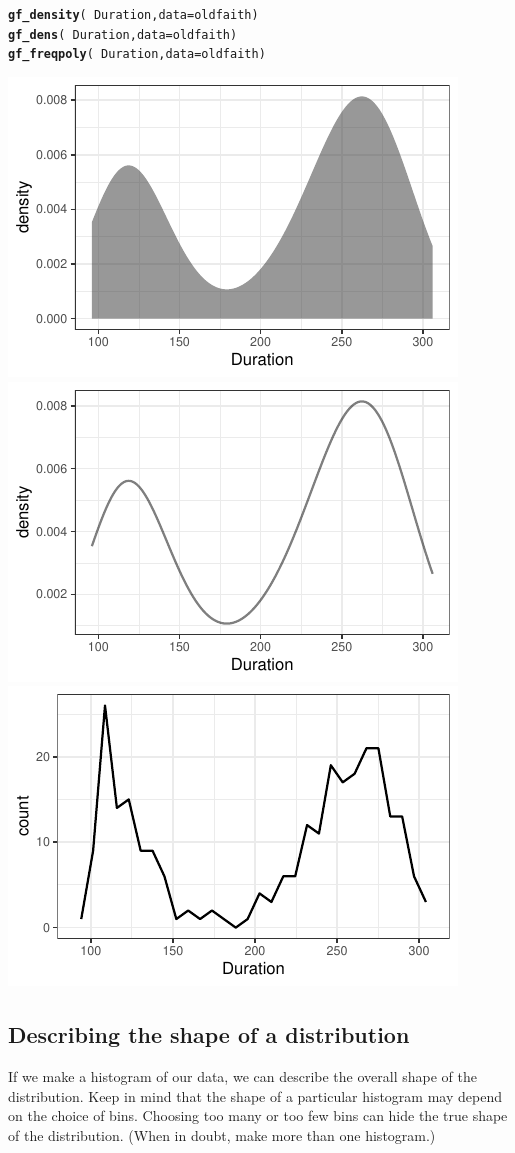 \documentclass[twoside]{book}\usepackage[]{graphicx}\usepackage[]{xcolor}
\makeatletter
\newcommand{\hlopt}[1]{\textcolor[rgb]{0,0,0}{#1}}%
\newcommand{\hlstd}[1]{\textcolor[rgb]{0.345,0.345,0.345}{#1}}%
\newcommand{\hlkwc}[1]{\textcolor[rgb]{0.333,0.667,0.333}{#1}}%
\newcommand{\hlkwd}[1]{\textcolor[rgb]{0.737,0.353,0.396}{\textbf{#1}}}%
\newenvironment{kframe}{%
 \def\at@end@of@kframe{}%
 \ifinner\ifhmode%
  \def\at@end@of@kframe{\end{minipage}}%
  \begin{minipage}{\columnwidth}%
 \fi\fi%
 \def\FrameCommand##1{\hskip\@totalleftmargin \hskip-\fboxsep
 \colorbox{shadecolor}{##1}\hskip-\fboxsep
     \hskip-\linewidth \hskip-\@totalleftmargin \hskip\columnwidth}%
 \MakeFramed {\advance\hsize-\width
   \@totalleftmargin\z@ \linewidth\hsize
   \@setminipage}}%
 {\par\unskip\endMakeFramed%
 \at@end@of@kframe}
\newenvironment{knitrout}{}{} %
\makeatother
\begin{document}
\begin{knitrout}
\color{fgcolor}\begin{kframe}
\begin{alltt}
\hlkwd{gf_density}\hlstd{(} \hlopt{~} \hlstd{Duration,} \hlkwc{data} \hlstd{= oldfaith )}
\hlkwd{gf_dens}\hlstd{(} \hlopt{~} \hlstd{Duration,} \hlkwc{data} \hlstd{= oldfaith )}
\hlkwd{gf_freqpoly}\hlstd{(} \hlopt{~} \hlstd{Duration,} \hlkwc{data} \hlstd{= oldfaith )}
\end{alltt}


{\ttfamily\noindent\itshape\color{messagecolor}{\#\# `stat\_bin()` using `bins = 30`. Pick better value with `binwidth`.}}\end{kframe}

{\centering \includegraphics[width=.3\textwidth]{figures/fig-density-1} 
\includegraphics[width=.3\textwidth]{figures/fig-density-2} 
\includegraphics[width=.3\textwidth]{figures/fig-density-3} 

}



\end{knitrout}


\subsection{Describing the shape of a distribution}

If we make a histogram of our data, we can describe the overall shape of the distribution.
Keep in mind that the shape of a particular histogram may depend on the choice of bins.
Choosing too many or too few bins can hide the true shape of the distribution.  (When in doubt, make
more than one histogram.)
\end{document}
